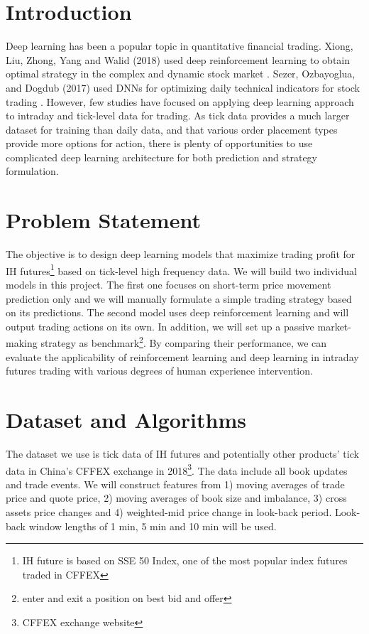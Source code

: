 \documentclass{article}
\begin{document}
\section{Introduction}
\label{intro}

Deep learning has been a popular topic in quantitative financial trading. Xiong, Liu, Zhong, Yang and Walid (2018) used deep reinforcement learning to obtain optimal strategy in the complex and dynamic stock market \cite{xiong2018practical}. Sezer, Ozbayoglua, and Dogdub (2017) used DNNs for optimizing daily technical indicators for stock trading \cite{SEZER2017473}. However, few studies have focused on applying deep learning approach to intraday and tick-level data for trading. As tick data provides a much larger dataset for training than daily data, and that various order placement types provide more options for action, there is plenty of opportunities to use complicated deep learning architecture for both prediction and strategy formulation.

\section{Problem Statement}

The objective is to design deep learning models that maximize trading profit for IH futures\footnote{IH future is based on SSE 50 Index, one of the most popular index futures traded in CFFEX} based on tick-level high frequency data. We will build two individual models in this project. The first one focuses on short-term price movement prediction only and we will manually formulate a simple trading strategy based on its predictions. The second model uses deep reinforcement learning and will output trading actions on its own. In addition, we will set up a passive market-making strategy as benchmark\footnote{enter and exit a position on best bid and offer}. By comparing their performance, we can evaluate the applicability of reinforcement learning and deep learning in intraday futures trading with various degrees of human experience intervention.

\section{Dataset and Algorithms}

The dataset we use is tick data of IH futures and potentially other products’ tick data in China’s CFFEX exchange in 2018\footnote{CFFEX exchange website}. The data include all book updates and trade events. We will construct features from 1) moving averages of trade price and quote price, 2) moving averages of book size and imbalance, 3) cross assets price changes and 4) weighted-mid price change in look-back period. Look-back window lengths of 1 min, 5 min and 10 min will be used.
\end{document}
